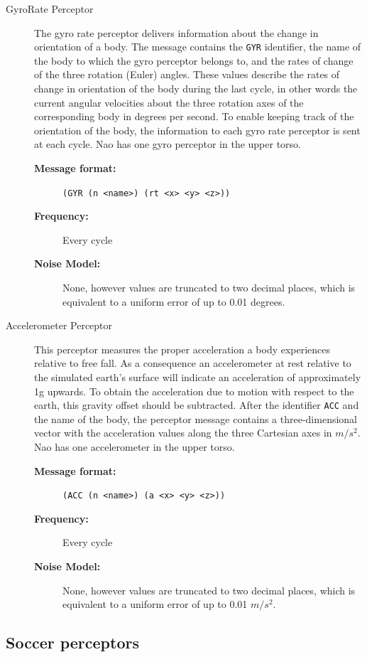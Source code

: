 \begin{description}
  \item [GyroRate Perceptor]
  The gyro rate perceptor delivers information about the change in orientation of a body. The message contains the \texttt{GYR} identifier, the name of the body to which the gyro perceptor belongs to, and the rates of change of the three rotation (Euler) angles. These values describe the rates of change in orientation of the body during the last cycle, in other words the current angular velocities about the three rotation axes of the corresponding body in degrees per second. To enable keeping track of the orientation of the body, the information to each gyro rate perceptor is sent at each cycle. Nao has one gyro perceptor in the upper torso.
  \begin{description}
  \item[{\bf Message format:}]
  \texttt{(GYR (n <name>) (rt <x> <y> <z>))}
  \item[{\bf Frequency:}]
  Every cycle
  \item[{\bf Noise Model:}]None, however values are truncated to two decimal places, which is equivalent to a uniform error of up to 0.01 degrees.
  \end{description}

  \item [Accelerometer Perceptor]
  This perceptor measures the proper acceleration a body experiences relative to free fall. As a consequence an accelerometer at rest relative to the simulated earth's surface will indicate an acceleration of approximately 1g upwards. To obtain the acceleration due to motion with respect to the earth, this gravity offset should be subtracted. After the identifier \texttt{ACC} and the name of the body, the perceptor message contains a three-dimensional vector with the acceleration values along the three Cartesian axes in $m/s^2$. Nao has one accelerometer in the upper torso.
    \begin{description}
  \item[{\bf Message format:}]
  \texttt{(ACC (n <name>) (a <x> <y> <z>))}
  \item[{\bf Frequency:}]
  Every cycle
  \item[{\bf Noise Model:}]None, however values are truncated to two decimal places, which is equivalent to a uniform error of up to 0.01 $m/s^{2}$.
  \end{description}
\end{description}

\subsection{Soccer perceptors}
\label{sec:soccerperceptors}


